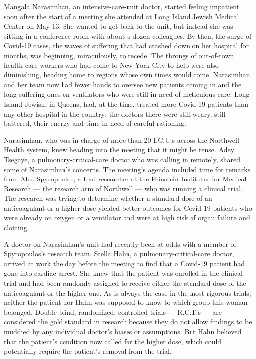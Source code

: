 Mangala Narasimhan, an intensive-care-unit doctor, started feeling
impatient soon after the start of a meeting she attended at Long Island
Jewish Medical Center on May 13. She wanted to get back to the unit, but
instead she was sitting in a conference room with about a dozen
colleagues. By then, the surge of Covid-19 cases, the waves of suffering
that had crashed down on her hospital for months, was beginning,
miraculously, to recede. The throngs of out-of-town health care workers
who had come to New York City to help were also diminishing, heading
home to regions whose own times would come. Narasimhan and her team now
had fewer hands to oversee new patients coming in and the long-suffering
ones on ventilators who were still in need of meticulous care. Long
Island Jewish, in Queens, had, at the time, treated more Covid-19
patients than any other hospital in the country; the doctors there were
still weary, still battered, their energy and time in need of careful
rationing.

Narasimhan, who was in charge of more than 20 I.C.U.s across the
Northwell Health system, knew heading into the meeting that it might be
tense. Adey Tsegaye, a pulmonary-critical-care doctor who was calling in
remotely, shared some of Narasimhan's concerns. The meeting's agenda
included time for remarks from Alex Spyropoulos, a lead researcher at
the Feinstein Institutes for Medical Research --- the research arm of
Northwell --- who was running a clinical trial. The research was trying
to determine whether a standard dose of an anticoagulant or a higher
dose yielded better outcomes for Covid-19 patients who were already on
oxygen or a ventilator and were at high risk of organ failure and
clotting.

A doctor on Narasimhan's unit had recently been at odds with a member of
Spyropoulos's research team. Stella Hahn, a pulmonary-critical-care
doctor, arrived at work the day before the meeting to find that a
Covid-19 patient had gone into cardiac arrest. She knew that the patient
was enrolled in the clinical trial and had been randomly assigned to
receive either the standard dose of the anticoagulant or the higher one.
As is always the case in the most rigorous trials, neither the patient
nor Hahn was supposed to know to which group this woman belonged.
Double-blind, randomized, controlled trials --- R.C.T.s --- are
considered the gold standard in research because they do not allow
findings to be muddied by any individual doctor's biases or assumptions.
But Hahn believed that the patient's condition now called for the higher
dose, which could potentially require the patient's removal from the
trial.

